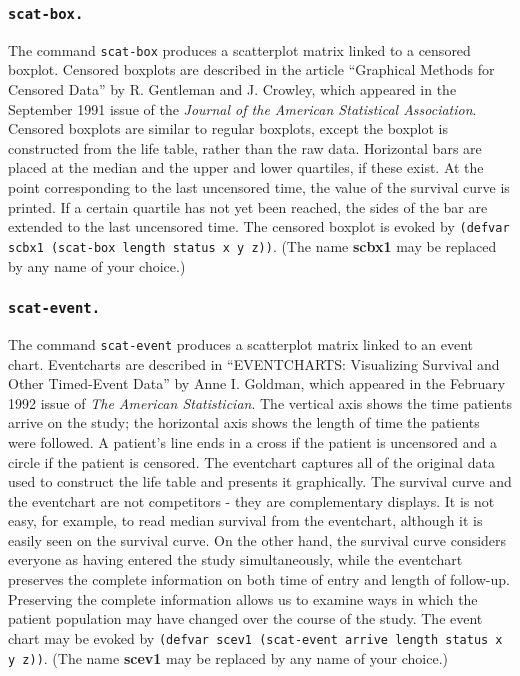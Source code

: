 \documentclass[11pt]{article}
\begin{document}
\subsubsection{\tt scat-box.}
The command {\tt scat-box} produces a scatterplot matrix linked to a
censored boxplot.
Censored boxplots are described in the article ``Graphical Methods for 
Censored Data'' by R. Gentleman and J. Crowley, which appeared in the 
September 1991 issue of the {\em Journal of the American Statistical 
Association}.  
Censored boxplots are similar to regular boxplots, except the 
boxplot is constructed from the life table, 
rather than the raw data. Horizontal bars are placed at the median and 
the upper and lower quartiles, if these exist. At the point corresponding 
to the last uncensored time, the value of the survival curve is printed. 
If a certain quartile has not yet been reached, the sides of the bar are 
extended to the last uncensored time. The censored boxplot is evoked by
{\tt(defvar scbx1 (scat-box length status x y z))}.
(The name {\bf scbx1} may be
replaced by any name of your choice.)
\subsubsection{\tt scat-event.} 
The command {\tt scat-event} produces a scatterplot matrix linked to an
event chart.
Eventcharts are described in ``EVENTCHARTS: Visualizing Survival and 
Other Timed-Event Data'' by Anne I. Goldman, which appeared in the 
February 1992 issue of {\em The American Statistician}. 
The vertical axis shows the time patients 
arrive on the study; the horizontal axis shows the length of time the 
patients were followed. 
A patient's line ends in a cross if the patient is uncensored and a circle
if the patient is censored.
The eventchart captures all of the original data used to 
construct the life table and presents it graphically. The survival curve 
and the eventchart are not competitors - they are complementary displays. 
It is not easy, for example, to read median survival from the eventchart, 
although it is easily seen on the survival curve. On the other hand, the 
survival curve considers everyone as having entered the study 
simultaneously, while the eventchart preserves the complete information 
on both time of entry and length of follow-up. 
Preserving the complete information
allows us to examine ways in which the patient population may have 
changed over the course of the study.
The event chart may be evoked by
{\tt(defvar scev1 (scat-event arrive length status x y z))}.
(The name {\bf scev1} may be
replaced by any name of your choice.)
\end{document}

